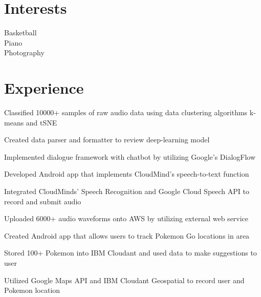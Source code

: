\documentclass[]{deedy-resume-openfont}
\begin{document}
\begin{minipage}[t]{0.33\textwidth}
\section{Interests}
Basketball \\ Piano \\ Photography 
\sectionsep

%
%

\end{minipage} 
\hfill
\begin{minipage}[t]{0.66\textwidth} 


\section{Experience}

\sectionsep
\begin{tightemize} 
\item Classified 10000+ samples of raw audio data using data clustering algorithms k-means and tSNE
\item Created data parser and formatter to review deep-learning model
\item Implemented dialogue framework with chatbot by utilizing Google's DialogFlow
\end{tightemize}
\sectionsep

\begin{tightemize} 
\item Developed Android app that implements CloudMind's speech-to-text function
\item Integrated CloudMinds’ Speech Recognition and Google Cloud Speech API to record and submit audio
\item Uploaded 6000+ audio waveforms onto AWS by utilizing external web service 
\end{tightemize}
\sectionsep

\begin{tightemize} 
\item Created Android app that allows users to track Pokemon Go locations in area 
\item Stored 100+ Pokemon into IBM Cloudant and used data to make suggestions to user
\item  Utilized Google Maps API and IBM Cloudant Geospatial to record user and Pokemon location
\end{tightemize}
\sectionsep


\end{minipage}
\end{document}
